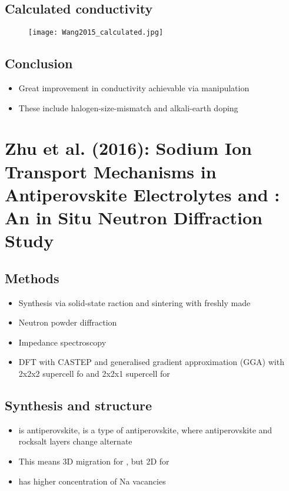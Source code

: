 \documentclass[10pt,a4paper, titlepage]{article}
\begin{document}
\subsection{Calculated conductivity}

\begin{figure}[H]
\centering
\texttt{[image: Wang2015\_calculated.jpg]}
\end{figure}

\subsection{Conclusion}

\begin{itemize}
  \item Great improvement in conductivity achievable via manipulation
  \item These include halogen-size-mismatch and alkali-earth doping
\end{itemize}

\section{Zhu et al. (2016): Sodium Ion Transport Mechanisms in Antiperovskite Electrolytes  and : An in Situ Neutron Diffraction Study}

\subsection{Methods}

\begin{itemize}
  \item Synthesis via solid-state raction and sintering with freshly made 
  \item Neutron powder diffraction
  \item Impedance spectroscopy
  \item DFT with CASTEP and generalised gradient approximation (GGA) with 2x2x2 supercell fo  and 2x2x1 supercell for 
\end{itemize}

\subsection{Synthesis and structure}

\begin{itemize}
  \item {} is antiperovskite,  is a type of antiperovskite, where antiperovskite and rocksalt layers change alternate
  \item This means 3D migration for , but 2D for 
  \item{} has higher concentration of Na vacancies
\end{itemize}
\end{document}
